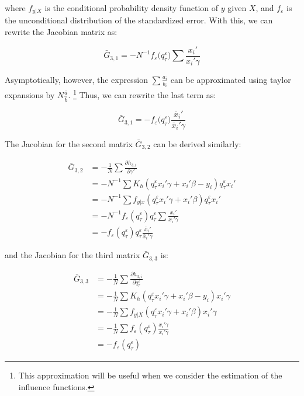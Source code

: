 \documentclass[
  authoryear,
  preprint,
  1p]{elsarticle}
\begin{document}
where \(f_{y|X}\) is the conditional probability density function of
\(y\) given \(X\), and \(f_\varepsilon\) is the unconditional
distribution of the standardized error. With this, we can rewrite the
Jacobian matrix as:

\[\bar G_{3,1} = -N^{-1} f_{\varepsilon}\big(q^\varepsilon_\tau\big) \sum  \frac{x_i'}{x_i'\gamma} 
\]

Asymptotically, however, the expression \(\sum\frac{a_i}{b_i}\) can be
approximated using taylor expansions by \(N\frac{\bar a}{\bar b}\).
\footnote{This approximation will be useful when we consider the
  estimation of the influence functions.} Thus, we can rewrite the last
term as:

\[\bar G_{3,1} = - f_{\varepsilon}\big(q^\varepsilon_\tau\big) \frac{\bar x_i'}{\bar x_i'\gamma} 
\]

The Jacobian for the second matrix \(\bar G_{3,2}\) can be derived
similarly:

\[\begin{aligned}
\bar G_{3,2} &= -\frac{1}{N} \sum \frac{\partial h_{3,i}}{\partial \gamma'} \\
             &= -N^{-1} \sum K_h(q^\varepsilon_\tau x_i'\gamma +x_i'\beta - y_i ) q^\varepsilon_\tau x_i' \\
             &=-N^{-1} \sum f_{y|x}(q^\varepsilon_\tau x_i'\gamma +x_i'\beta ) q^\varepsilon_\tau x_i' \\
             &=-N^{-1} f_{\varepsilon}(q^\varepsilon_\tau) q^\varepsilon_\tau \sum \frac{x_i'}{x_i'\gamma} \\
             &=- f_{\varepsilon}(q^\varepsilon_\tau) q^\varepsilon_\tau \frac{\bar x_i'}{\bar x_i'\gamma}
\end{aligned}
\]

and the Jacobian for the third matrix \(\bar G_{3,3}\) is:

\[\begin{aligned}
\bar G_{3,3} &= -\frac{1}{N} \sum \frac{\partial h_{3,i}}{\partial q^\varepsilon_\tau} \\
 &= -\frac{1}{N} \sum K_h(q^\varepsilon_\tau x_i'\gamma +x_i'\beta - y_i ) x_i'\gamma \\
 &= -\frac{1}{N} \sum f_{y|X}(q^\varepsilon_\tau x_i'\gamma +x_i'\beta) x_i'\gamma \\
 &= -\frac{1}{N} \sum f_{\varepsilon}(q^\varepsilon_\tau) \frac{x_i'\gamma}{ x_i'\gamma} \\
 &= - f_{\varepsilon}(q^\varepsilon_\tau) 
\end{aligned}
\]
\end{document}
